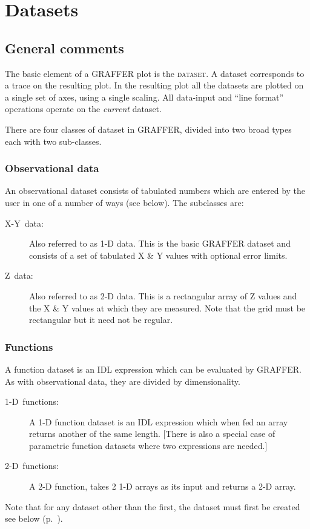 \documentclass[11pt,twoside,english]{article}
\begin{document}
\section{Datasets}


\subsection{General comments}

The basic element of a GRAFFER plot is the \textsc{dataset}. A dataset
corresponds to a trace on the resulting plot. In the resulting plot all
the datasets are plotted on a single set of axes, using a single
scaling. All data-input and {}``line format'' operations operate on the
\textit{current} dataset.

There are four classes of dataset in GRAFFER, divided into two broad
types each with two sub-classes.


\subsubsection{Observational data }

An observational dataset consists of tabulated numbers which are
entered by the user in one of a number of ways (see below). The
subclasses are:

\begin{description}
\item [X-Y~data:]Also referred to as 1-D data. This is the basic
  GRAFFER dataset and consists of a set of tabulated X \& Y values with
  optional error limits.
\item [Z~data:]Also referred to as 2-D data. This is a rectangular
  array of Z values and the X \& Y values at which they are
  measured. Note that the grid must be rectangular but it need not be
  regular.
\end{description}

\subsubsection{Functions }

A function dataset is an IDL expression which can be evaluated by
GRAFFER. As with observational data, they are divided by
dimensionality.

\begin{description}
\item [1-D~functions:]A 1-D function dataset is an IDL expression which
  when fed an array returns another of the same length. {[}There is
  also a special case of parametric function datasets where two
  expressions are needed.{]}
\item [2-D~functions:]A 2-D function, takes 2 1-D arrays as its input
  and returns a 2-D array.
\end{description}
Note that for any dataset other than the first, the dataset must first
be created see below (p.~\pageref{make-new-ds}).
\end{document}
